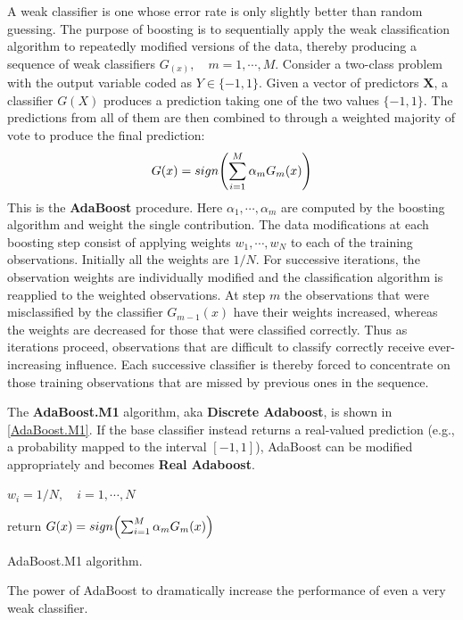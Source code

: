 \documentclass[12pt, letterpaper]{article}
\theoremstyle{definition}
\newcommand{\X}{\mathrm{\mathbf{X}}}
\DeclarePairedDelimiter\autobracket{(}{)}
\newcommand{\br}[1]{\autobracket*{#1}}
\begin{document}
A weak classifier is one whose error rate is only slightly better than random guessing. The purpose of boosting is to sequentially apply the weak classification algorithm to repeatedly modified versions of the data, thereby producing a sequence of weak classifiers $G_(x), \quad m=1,\cdots, M$. 
Consider a two-class problem with the output variable coded as $Y\in\{-1,1\}$. Given a vector of predictors $\X$, a classifier $G(X)$ produces a prediction taking one of the two values $\{-1,1\}$.
The predictions from all of them are then combined to through a weighted majority of vote to produce the final prediction:
\begin{equation}
G(x) = sign\br{\sum_{i=1}^M \alpha_mG_m(x)}
\end{equation}
This is the \textbf{AdaBoost} procedure. Here $\alpha_1, \cdots, \alpha_m$ are computed by the boosting algorithm and weight the single contribution. The data modifications at each boosting step consist of applying weights $w_1, \cdots, w_N$ to each of the training observations. Initially all the weights are $1/N$. For successive iterations,  the observation weights are individually modified and the classification algorithm is reapplied to the weighted observations. At step $m$ the observations that were misclassified by the classifier $G_{m-1}(x)$ have their weights increased, whereas the weights are decreased for those that were classified correctly. Thus as iterations proceed, observations that are difficult to classify correctly receive ever-increasing influence. Each successive classifier is thereby forced to concentrate on those training observations that are missed by previous ones in the sequence.
 
 The \textbf{AdaBoost.M1} algorithm, aka \textbf{Discrete Adaboost}, is shown in \autoref{AdaBoost.M1}. If the base classifier instead returns a real-valued prediction (e.g., a probability mapped to the interval $[-1,1]$), AdaBoost can be modified appropriately and becomes \textbf{Real Adaboost}.
 \begin{algorithm}[!ht]
    $w_i=1/N, \quad i=1,\cdots,N$
    
		return $G(x) = sign\br{\sum_{i=1}^M \alpha_mG_m(x)}$
\caption{AdaBoost.M1 algorithm.}
\label{AdaBoost.M1}
\end{algorithm}
The power of AdaBoost to dramatically increase the performance of even a very weak classifier.
\end{document}
